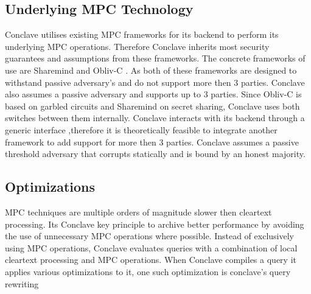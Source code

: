 \subsection{Underlying MPC Technology}
Conclave utilises existing MPC frameworks for its backend to perform its underlying MPC operations. Therefore Conclave inherits most security guarantees and assumptions from these frameworks. The concrete frameworks of use are Sharemind \cite{bogdanov2008sharemind} and Obliv-C \cite{zahur2015obliv}. As both of these frameworks are designed to withstand passive adversary's and do not support more then 3 parties. Conclave also assumes a passive adversary and supports up to 3 parties.
Since Obliv-C is based on garbled circuits and Sharemind on secret sharing, Conclave uses both switches between them internally. Conclave interacts with its backend through a generic interface ,therefore it is theoretically feasible to integrate another framework to add support for more then 3 parties. Conclave assumes a passive threshold adversary that corrupts statically and is bound by an honest majority.




\subsection{Optimizations}
MPC techniques are multiple orders of magnitude slower then cleartext processing. Its Conclave key principle to archive better performance by avoiding the use of unnecessary MPC operations where possible. Instead of exclusively using MPC operations, Conclave evaluates queries with a combination of local cleartext processing and MPC operations. When Conclave compiles a query it applies various optimizations to it, one such optimization is conclave's query rewriting 

